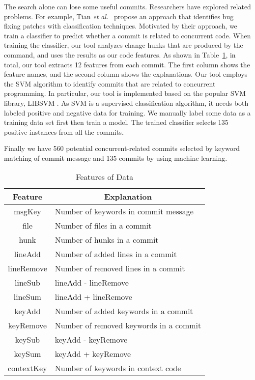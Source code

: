 The search alone can lose some useful commits. Researchers have explored related problems. For example, Tian \emph{et al.}~\cite{tian2012identifying} propose an approach that identifies bug fixing patches with classification techniques. Motivated by their approach, we train a classifier to predict whether a commit is related to concurrent code. When training the classifier, our tool analyzes change hunks that are produced by the  command, and uses the results as our code features. As shown in Table~\ref{table:feature}, in total, our tool extracts 12 features from each commit. The first column shows the feature names, and the second column shows the explanations.
Our tool employs the SVM \cite{journals/ml/CortesV95} algorithm to identify commits that are related to concurrent programming. In particular, our tool is implemented based on the popular SVM library, LIBSVM \cite{libsvm}. As SVM is a supervised classification algorithm, it needs both labeled positive and negative data for training. We manually label some data as a training data set first then train a model. The trained classifier selects 135 positive instances from all the commits.


Finally we have 560 potential concurrent-related commits selected by keyword matching of commit message and 135 commits by using machine learning.

\begin{table}
	\centering
	\caption{Features of Data}
	\label{table:feature}
	\begin{tabular}{|c|l|}\hline
		Feature&\multicolumn{1}{|c|}{Explanation}\\\hline
		msgKey&Number of keywords in commit message\\
		file&Number of files in a commit\\
		hunk&Number of hunks in a commit\\
		lineAdd&Number of added lines in a commit\\
		lineRemove&Number of removed lines in a commit\\
		lineSub&lineAdd - lineRemove\\
		lineSum&lineAdd + lineRemove\\
		keyAdd&Number of added keywords in a commit\\
		keyRemove&Number of removed keywords in a commit\\
		keySub&keyAdd - keyRemove\\
		keySum&keyAdd + keyRemove\\
		contextKey&Number of keywords in context code\\\hline
	\end{tabular}
\end{table}

